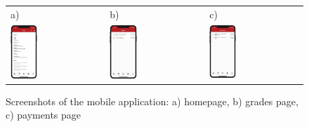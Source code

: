 \begin{figure}[htb]
    \centering
    \begin{tabular}{@{}lll@{}}
        a) & b) & c)\\
        {\includegraphics[page=1,width=0.300\textwidth]{fig06/home_page.png}} &
        {\includegraphics[page=1,width=0.300\textwidth]{fig06/grades_page.png}} &
        {\includegraphics[page=7,width=0.300\textwidth]{fig06/payments_page.png}} \\
    \end{tabular}
    \caption{Screenshots of the mobile application: a) homepage, b) grades page, c) payments page} \label{fig:home-grades-payments}
\end{figure}


